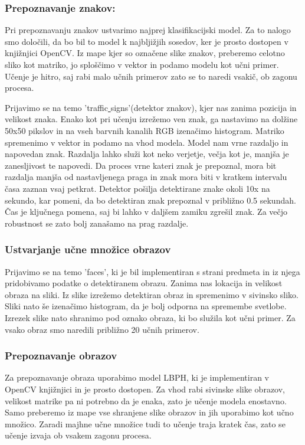 \documentclass{llncs}
\begin{document}
\subsubsection{Prepoznavanje znakov:}
Pri prepoznavanju znakov ustvarimo najprej klasifikacijski model. Za to nalogo smo določili, da bo bil to model k najbljižjih sosedov, ker je prosto dostopen v knjižnjici OpenCV. Iz mape kjer so označene slike znakov, preberemo celotno sliko kot matriko, jo sploščimo v vektor in podamo modelu kot učni primer. Učenje je hitro, saj rabi malo učnih primerov zato se to naredi vsakič, ob zagonu procesa. 

Prijavimo se na temo 'traffic\underline{ }signs'(detektor znakov), kjer nas zanima pozicija in velikost znaka. Enako kot pri učenju izrežemo ven znak, ga nastavimo na dolžine 50x50 pikslov in na vseh barvnih kanalih RGB izenačimo histogram. Matriko spremenimo v vektor in podamo na vhod modela. Model nam vrne razdaljo in napovedan znak. Razdalja lahko služi kot neko verjetje, večja kot je, manjša je zanesljivost te napovedi. Da proces vrne kateri znak je prepoznal, mora bit razdalja manjša od nastavljenega praga in znak mora biti v kratkem intervalu časa zaznan vsaj petkrat. Detektor pošilja detektirane znake okoli 10x na sekundo, kar pomeni, da bo detektiran znak prepoznal v približno 0.5 sekundah. Čas je ključnega pomena, saj bi lahko v daljšem zamiku zgrešil znak. Za večjo robustnost se zato bolj zanašamo na prag razdalje. 

\subsubsection{Ustvarjanje učne množice obrazov}
Prijavimo se na temo 'faces', ki je bil implementiran s strani predmeta in iz njega pridobivamo podatke o detektiranem obrazu. Zanima nas lokacija in velikost obraza na sliki. Iz slike izrežemo detektiran obraz in spremenimo v sivinsko sliko. Sliki nato še izenačimo histogram, da je bolj odporna na spremembe svetlobe. Izrezek slike nato shranimo pod oznako obraza, ki bo služila kot učni primer. Za vsako obraz smo naredili približno 20 učnih primerov. 

\subsubsection{Prepoznavanje obrazov}
Za prepoznavanje obraza uporabimo model LBPH, ki je implementiran v OpenCV knjižnjici in je prosto dostopen. Za vhod rabi sivinske slike obrazov, velikost matrike pa ni potrebno da je enaka, zato je učenje modela enostavno. Samo preberemo iz mape vse shranjene slike obrazov in jih uporabimo kot učno množico. Zaradi majhne učne množice tudi to učenje traja kratek čas, zato se učenje izvaja ob vsakem zagonu procesa.
\end{document}
